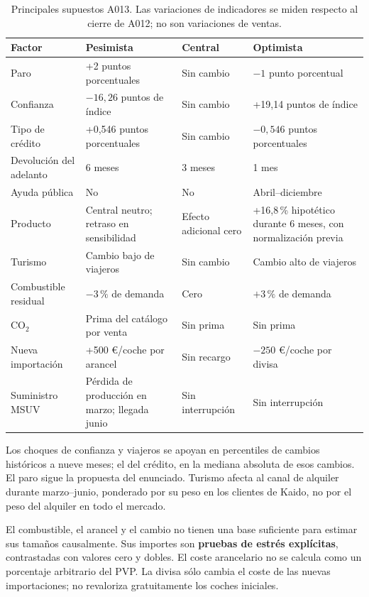 \begin{table}[htbp]\centering
\caption{Principales supuestos A013. Las variaciones de indicadores se miden
respecto al cierre de A012; no son variaciones de ventas.}\label{tab:escenarios-param}
\small
\begin{tabularx}{\linewidth}{@{}p{3.6cm}YYY@{}}\toprule
Factor & Pesimista & Central & Optimista \\\midrule
Paro & +2 puntos porcentuales & Sin cambio & $-1$ punto porcentual \\
Confianza & $-16{,}26$ puntos de índice & Sin cambio & +19,14 puntos de índice \\
Tipo de crédito & +0,546 puntos porcentuales & Sin cambio & $-0{,}546$ puntos porcentuales \\
Devolución del adelanto & 6 meses & 3 meses & 1 mes \\
Ayuda pública & No & No & Abril--diciembre \\
Producto & Central neutro; retraso en sensibilidad & Efecto adicional cero & +16,8\,\% hipotético durante 6 meses, con normalización previa \\
Turismo & Cambio bajo de viajeros & Sin cambio & Cambio alto de viajeros \\
Combustible residual & $-3\,\%$ de demanda & Cero & $+3\,\%$ de demanda \\
CO$_2$ & Prima del catálogo por venta & Sin prima & Sin prima \\
Nueva importación & +500 \euro/coche por arancel & Sin recargo & $-250$ \euro/coche por divisa \\
Suministro MSUV & Pérdida de producción en marzo; llegada junio & Sin interrupción & Sin interrupción \\\bottomrule
\end{tabularx}
\end{table}

Los choques de confianza y viajeros se apoyan en percentiles de cambios históricos
a nueve meses; el del crédito, en la mediana absoluta de esos cambios. El paro
sigue la propuesta del enunciado. Turismo afecta al canal de alquiler durante
marzo--junio, ponderado por su peso en los clientes de Kaido, no por el peso del
alquiler en todo el mercado.

El combustible, el arancel y el cambio no tienen una base suficiente para estimar
sus tamaños causalmente. Sus importes son \textbf{pruebas de estrés explícitas},
contrastadas con valores cero y dobles. El coste arancelario no se calcula como
un porcentaje arbitrario del PVP. La divisa sólo cambia el coste de las nuevas
importaciones; no revaloriza gratuitamente los coches iniciales.


